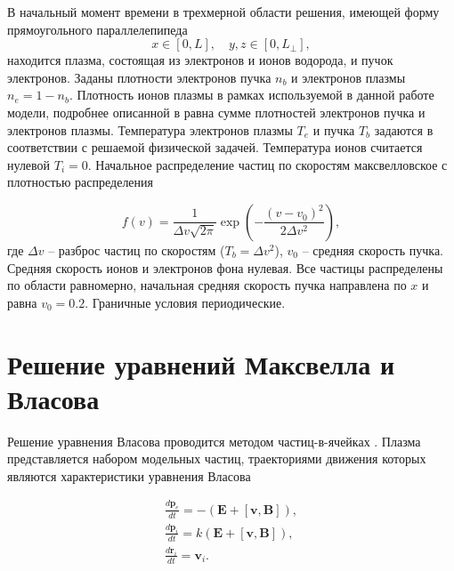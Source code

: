 В начальный момент времени в трехмерной области
решения, имеющей форму прямоугольного параллелепипеда $$
x\in[0,L],\quad y,z\in[0,L_\bot], $$ находится плазма, состоящая из
электронов и ионов водорода, и пучок электронов. Заданы плотности электронов пучка $n_b$ и электронов плазмы $n_e = 1-n_b$. Плотность ионов плазмы в рамках используемой в данной работе модели, подробнее описанной в \cite{VychMetPlasma} равна сумме плотностей электронов пучка и электронов плазмы. Температура электронов плазмы $T_e$ и пучка $T_b$ задаются в соответствии с решаемой физической задачей. Температура ионов считается нулевой $T_i=0$. Начальное распределение частиц по скоростям макс\-вел\-ловс\-кое с плотностью распределения

$$
f(v)=\frac{1}{\Delta v \sqrt{2
		\pi}}\exp \left( {-\frac{(v-v_0)^2}{2 \Delta v^2}}\right) ,
$$
где $\Delta v$ -- разброс частиц по скоростям ($T_b=\Delta v^2$), $v_0$ -- средняя
скорость пучка. Средняя скорость ионов и электронов фона нулевая. Все частицы распределены по области равномерно, начальная средняя скорость пучка направлена по $x$ и равна $v_0=0.2$. Граничные условия периодические. 








\section{Решение уравнений Максвелла и Власова}

Решение уравнения Власова проводится методом
частиц-в-ячейках \cite{hockney, birdsall2004plasma,VshivkovPICbook}. Плазма представляется набором модельных частиц, траекториями движения которых являются характеристики урав\-не\-ния Власова

\begin{equation}\label{eq:char}
\begin{array}{c}
\frac{d {\textbf{p}} _{e}}{d t}=-(\textbf{E}+[\textbf{v},\textbf{B}]), \\
\frac{d {\textbf{p}} _{i}}{d t}=k(\textbf{E}+[\textbf{v},\textbf{B}]), \\
\frac{d {\textbf{r}} _{i}}{d t}={\textbf{v}}_{i}.
\end{array}
\end{equation}


